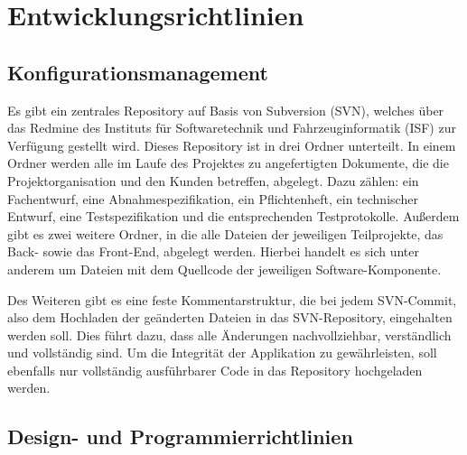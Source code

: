 
\chapter{Entwicklungsrichtlinien}

\section{Konfigurationsmanagement}

Es gibt ein zentrales Repository auf Basis von Subversion (SVN), welches \"uber das Redmine des Instituts f\"ur Softwaretechnik und Fahrzeuginformatik (ISF) zur Verf\"ugung gestellt wird. Dieses Repository ist in drei Ordner unterteilt. In einem Ordner werden alle im Laufe des Projektes zu angefertigten Dokumente, die die Projektorganisation und den Kunden betreffen, abgelegt. Dazu z\"ahlen: ein Fachentwurf, eine Abnahmespezifikation, ein Pflichtenheft, ein technischer Entwurf, eine Testspezifikation und die entsprechenden Testprotokolle. Au{\ss}erdem gibt es zwei weitere Ordner, in die alle Dateien der jeweiligen Teilprojekte, das Back- sowie das Front-End, abgelegt werden. Hierbei handelt es sich unter anderem um Dateien mit dem Quellcode der jeweiligen Software-Komponente.  

Des Weiteren gibt es eine feste Kommentarstruktur, die bei jedem SVN-Commit, also dem Hochladen der ge\"anderten Dateien in das SVN-Repository, eingehalten werden soll. Dies f\"uhrt dazu, dass alle \"Anderungen nachvollziehbar, verst\"andlich und vollst\"andig sind. Um die Integrit\"at der Applikation zu gew\"ahrleisten, soll ebenfalls nur vollst\"andig ausf\"uhrbarer Code in das Repository hochgeladen werden.  


\section{Design- und Programmierrichtlinien}

